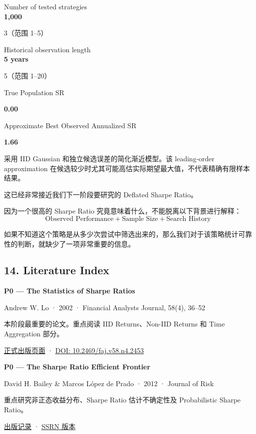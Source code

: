 Number of tested strategies\\
\textbf{1,000}

3（范围 1--5）

Historical observation length\\
\textbf{5 years}

5（范围 1--20）

True Population SR

\textbf{0.00}

Approximate Best Observed Annualized SR

\textbf{1.66}

采用 IID Gaussian 和独立候选误差的简化渐近模型。该 leading-order approximation 在候选较少时尤其可能高估实际期望最大值，不代表精确有限样本结果。

这已经非常接近我们下一阶段要研究的 Deflated Sharpe Ratio。

因为一个很高的 Sharpe Ratio 究竟意味着什么，不能脱离以下背景进行解释：
\[\boxed{
\text{Observed Performance}
+
\text{Sample Size}
+
\text{Search History}
}\]

如果不知道这个策略是从多少次尝试中筛选出来的，那么我们对于该策略统计可靠性的判断，就缺少了一项非常重要的信息。

\hypertarget{part-4-67-0001-literature-index}{%
\subsection{14. Literature Index}\label{part-4-67-0001-literature-index}}

\textbf{P0 --- The Statistics of Sharpe Ratios}

Andrew W. Lo · 2002 · Financial Analysts Journal, 58(4), 36--52

本阶段最重要的论文。重点阅读 IID Returns、Non-IID Returns 和 Time Aggregation 部分。

\href{https://rpc.cfainstitute.org/research/financial-analysts-journal/2002/the-statistics-of-sharpe-ratios}{正式出版页面} · \href{https://doi.org/10.2469/faj.v58.n4.2453}{DOI: 10.2469/faj.v58.n4.2453}

\textbf{P0 --- The Sharpe Ratio Efficient Frontier}

David H. Bailey \& Marcos López de Prado · 2012 · Journal of Risk

重点研究非正态收益分布、Sharpe Ratio 估计不确定性及 Probabilistic Sharpe Ratio。

\href{https://ideas.repec.org/a/rsk/journ4/2223785.html}{出版记录} · \href{https://papers.ssrn.com/sol3/papers.cfm?abstract_id=1821643}{SSRN 版本}

